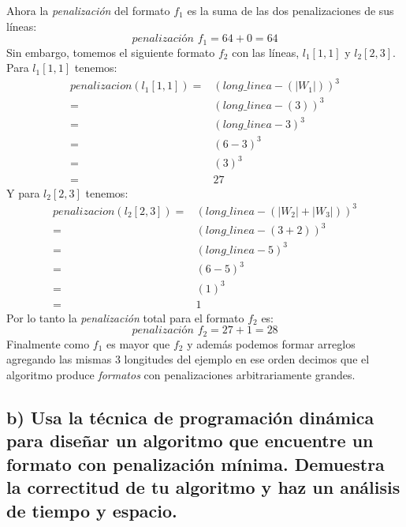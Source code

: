 \documentclass[12pt]{article}
\begin{document}
	Ahora la \textit{penalización} del formato $f_1$ es la suma de las dos penalizaciones de sus líneas:
	\begin{equation}
		\textit{penalización $f_1$}= 64 + 0 = 64 
	\end{equation}
	Sin embargo, tomemos el siguiente formato $f_2$ con las líneas, $l_1[1,1]$ y $l_2[2,3]$. Para $l_1[1,1]$ tenemos:
	\begin{equation}
	\begin{split}
	\textit{penalizacion}(l_1[1,1])= & (long\_linea - (|W_1|))^3 \\
	= & (long\_linea - (3))^3 \\
	= & (long\_linea - 3)^3\\
	= & (6 - 3)^3\\
	= & (3)^3 \\
	= & 27
	\end{split}
	\end{equation}
	Y para $l_2[2,3]$ tenemos:
	\begin{equation}
	\begin{split}
	\textit{penalizacion}(l_2[2,3])= & (long\_linea - (|W_2|+|W_3|))^3 \\
	= & (long\_linea - (3 + 2))^3 \\
	= & (long\_linea - 5)^3\\
	= & (6 - 5)^3\\
	= & (1)^3 \\
	= & 1
	\end{split}
	\end{equation}
	Por lo tanto la \textit{penalización} total para el formato $f_2$ es:
	\begin{equation}
	\textit{penalización $f_2$}= 27 + 1 = 28 
	\end{equation}
	Finalmente como $f_1$ es mayor que $f_2$ y además podemos formar arreglos agregando las mismas 3 longitudes del ejemplo en ese orden decimos que el algoritmo produce \textit{formatos} con penalizaciones arbitrariamente grandes.
	\subsection{b) Usa la técnica de programación dinámica para diseñar un algoritmo que encuentre un formato con penalización mínima. Demuestra la correctitud de tu algoritmo y haz un análisis de tiempo y espacio.}
	
\end{document}
